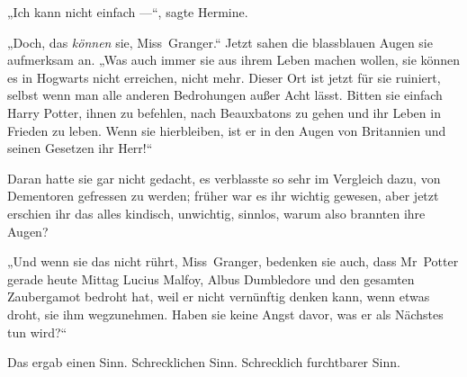 „Ich kann nicht einfach —“, sagte Hermine.

„Doch, das \emph{können} sie, Miss~Granger.“ Jetzt sahen die blassblauen Augen sie aufmerksam an.
„Was auch immer sie aus ihrem Leben machen wollen, sie können es in Hogwarts nicht erreichen, nicht mehr. Dieser Ort ist jetzt für sie ruiniert, selbst wenn man alle anderen Bedrohungen außer Acht lässt. Bitten sie einfach Harry Potter, ihnen zu befehlen, nach Beauxbatons zu gehen und ihr Leben in Frieden zu leben. Wenn sie hierbleiben, ist er in den Augen von Britannien und seinen Gesetzen ihr Herr!“

Daran hatte sie gar nicht gedacht, es verblasste so sehr im Vergleich dazu, von Dementoren gefressen zu werden; früher war es ihr wichtig gewesen, aber jetzt erschien ihr das alles kindisch, unwichtig, sinnlos, warum also brannten ihre Augen?

„Und wenn sie das nicht rührt, Miss~Granger, bedenken sie auch, dass Mr~Potter gerade heute Mittag Lucius Malfoy, Albus Dumbledore und den gesamten Zaubergamot bedroht hat, weil er nicht vernünftig denken kann, wenn etwas droht, sie ihm wegzunehmen. Haben sie keine Angst davor, was er als Nächstes tun wird?“

Das ergab einen Sinn. Schrecklichen Sinn. Schrecklich furchtbarer Sinn.

